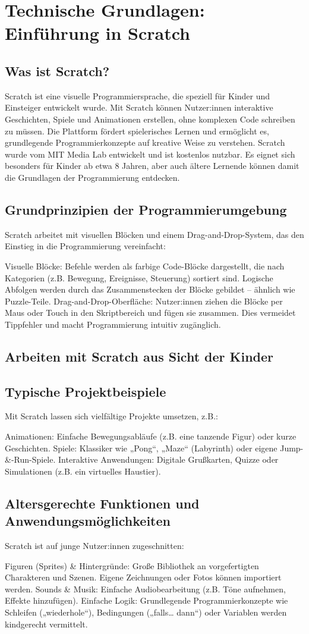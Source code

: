 \section{Technische Grundlagen: Einführung in Scratch}
\subsection{Was ist Scratch?}
Scratch ist eine visuelle Programmiersprache, die speziell für Kinder und Einsteiger entwickelt wurde. Mit Scratch können Nutzer:innen interaktive Geschichten, Spiele und Animationen erstellen, ohne komplexen Code schreiben zu müssen. Die Plattform fördert spielerisches Lernen und ermöglicht es, grundlegende Programmierkonzepte auf kreative Weise zu verstehen.
Scratch wurde vom MIT Media Lab entwickelt und ist kostenlos nutzbar. Es eignet sich besonders für Kinder ab etwa 8 Jahren, aber auch ältere Lernende können damit die Grundlagen der Programmierung entdecken.
\subsection{Grundprinzipien der Programmierumgebung}
Scratch arbeitet mit visuellen Blöcken und einem Drag-and-Drop-System, das den Einstieg in die Programmierung vereinfacht:

Visuelle Blöcke:
Befehle werden als farbige Code-Blöcke dargestellt, die nach Kategorien (z.B. Bewegung, Ereignisse, Steuerung) sortiert sind.
Logische Abfolgen werden durch das Zusammenstecken der Blöcke gebildet – ähnlich wie Puzzle-Teile.
Drag-and-Drop-Oberfläche:
Nutzer:innen ziehen die Blöcke per Maus oder Touch in den Skriptbereich und fügen sie zusammen.
Dies vermeidet Tippfehler und macht Programmierung intuitiv zugänglich.

\subsection{Arbeiten mit Scratch aus Sicht der Kinder}
\subsection{Typische Projektbeispiele}
Mit Scratch lassen sich vielfältige Projekte umsetzen, z.B.:

Animationen:
Einfache Bewegungsabläufe (z.B. eine tanzende Figur) oder kurze Geschichten.
Spiele:
Klassiker wie „Pong“, „Maze“ (Labyrinth) oder eigene Jump-&-Run-Spiele.
Interaktive Anwendungen:
Digitale Grußkarten, Quizze oder Simulationen (z.B. ein virtuelles Haustier).

\subsection{Altersgerechte Funktionen und Anwendungsmöglichkeiten}
Scratch ist auf junge Nutzer:innen zugeschnitten:

Figuren (Sprites) & Hintergründe:
Große Bibliothek an vorgefertigten Charakteren und Szenen.
Eigene Zeichnungen oder Fotos können importiert werden.
Sounds & Musik:
Einfache Audiobearbeitung (z.B. Töne aufnehmen, Effekte hinzufügen).
Einfache Logik:
Grundlegende Programmierkonzepte wie Schleifen („wiederhole“), Bedingungen („falls… dann“) oder Variablen werden kindgerecht vermittelt.
